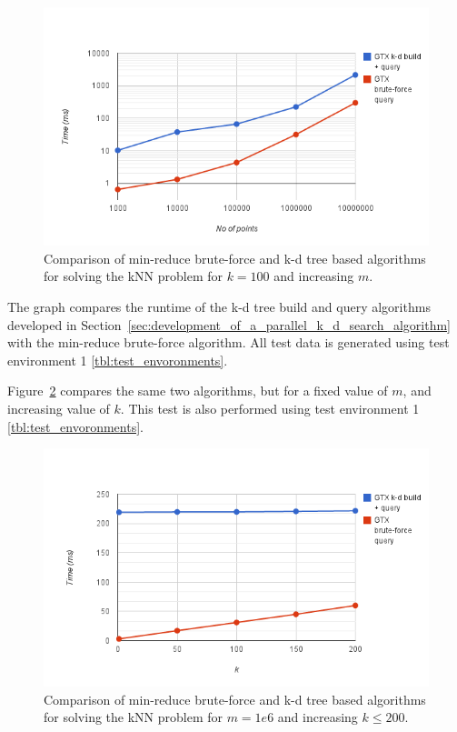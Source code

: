 \begin{figure}[ht!]
    \centering
    \includegraphics[width=120mm]{../gfx/final-knn-kd-vs-bf.png}
    \caption{Comparison of min-reduce brute-force and k-d tree based algorithms for solving the kNN problem for $k=100$ and increasing $m$.}
    \label{fig:final-knn-kd-vs-bf}
\end{figure}

The graph compares the runtime of the k-d tree build and query algorithms developed in Section~\ref{sec:development_of_a_parallel_k_d_search_algorithm} with the min-reduce brute-force algorithm. All test data is generated using test environment 1 \ref{tbl:test_envoronments}.

Figure~\ref{fig:final-var-knn-kd-vs-bf} compares the same two algorithms, but for a fixed value of $m$, and increasing value of $k$. This test is also performed using test environment 1 \ref{tbl:test_envoronments}.

\begin{figure}[ht!]
    \centering
    \includegraphics[width=120mm]{../gfx/final-var-knn-kd-vs-bf.png}
    \caption{Comparison of min-reduce brute-force and k-d tree based algorithms for solving the kNN problem for $m=1e6$ and increasing $k\le200$.}
    \label{fig:final-var-knn-kd-vs-bf}
\end{figure}

